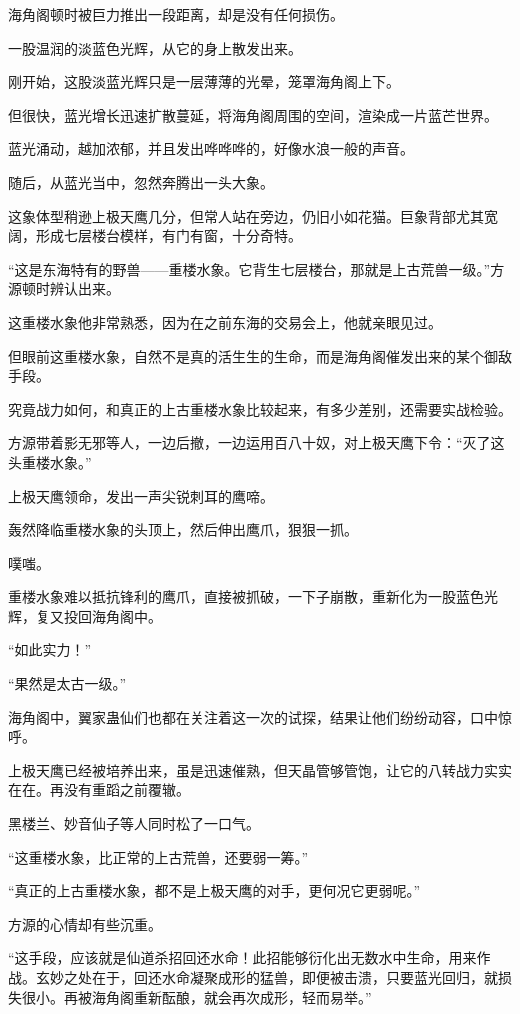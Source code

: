 \begin{this_body}
海角阁顿时被巨力推出一段距离，却是没有任何损伤。

一股温润的淡蓝色光辉，从它的身上散发出来。

刚开始，这股淡蓝光辉只是一层薄薄的光晕，笼罩海角阁上下。

但很快，蓝光增长迅速扩散蔓延，将海角阁周围的空间，渲染成一片蓝芒世界。

蓝光涌动，越加浓郁，并且发出哗哗哗的，好像水浪一般的声音。

随后，从蓝光当中，忽然奔腾出一头大象。

这象体型稍逊上极天鹰几分，但常人站在旁边，仍旧小如花猫。巨象背部尤其宽阔，形成七层楼台模样，有门有窗，十分奇特。

“这是东海特有的野兽——重楼水象。它背生七层楼台，那就是上古荒兽一级。”方源顿时辨认出来。

这重楼水象他非常熟悉，因为在之前东海的交易会上，他就亲眼见过。

但眼前这重楼水象，自然不是真的活生生的生命，而是海角阁催发出来的某个御敌手段。

究竟战力如何，和真正的上古重楼水象比较起来，有多少差别，还需要实战检验。

方源带着影无邪等人，一边后撤，一边运用百八十奴，对上极天鹰下令：“灭了这头重楼水象。”

上极天鹰领命，发出一声尖锐刺耳的鹰啼。

轰然降临重楼水象的头顶上，然后伸出鹰爪，狠狠一抓。

噗嗤。

重楼水象难以抵抗锋利的鹰爪，直接被抓破，一下子崩散，重新化为一股蓝色光辉，复又投回海角阁中。

“如此实力！”

“果然是太古一级。”

海角阁中，翼家蛊仙们也都在关注着这一次的试探，结果让他们纷纷动容，口中惊呼。

上极天鹰已经被培养出来，虽是迅速催熟，但天晶管够管饱，让它的八转战力实实在在。再没有重蹈之前覆辙。

黑楼兰、妙音仙子等人同时松了一口气。

“这重楼水象，比正常的上古荒兽，还要弱一筹。”

“真正的上古重楼水象，都不是上极天鹰的对手，更何况它更弱呢。”

方源的心情却有些沉重。

“这手段，应该就是仙道杀招回还水命！此招能够衍化出无数水中生命，用来作战。玄妙之处在于，回还水命凝聚成形的猛兽，即便被击溃，只要蓝光回归，就损失很小。再被海角阁重新酝酿，就会再次成形，轻而易举。”


\end{this_body}
